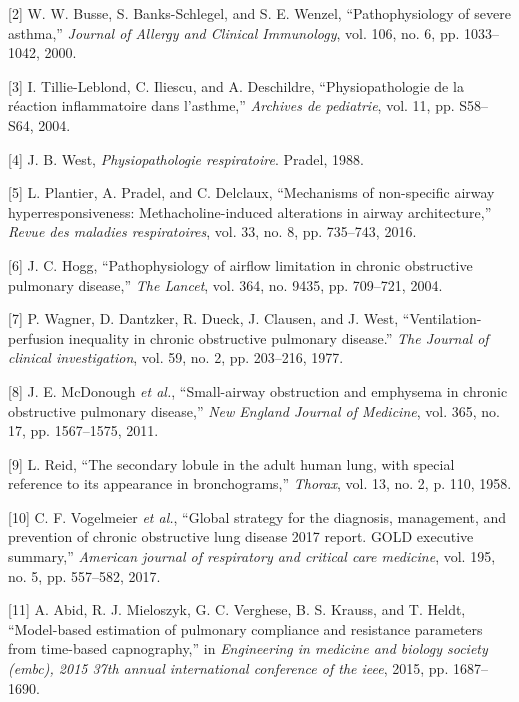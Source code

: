 \documentclass[12pt,]{article}
\begin{document}
\leavevmode\hypertarget{ref-busse2000pathophysiology}{}%
{[}2{]} W. W. Busse, S. Banks-Schlegel, and S. E. Wenzel,
``Pathophysiology of severe asthma,'' \emph{Journal of Allergy and
Clinical Immunology}, vol. 106, no. 6, pp. 1033--1042, 2000.

\leavevmode\hypertarget{ref-tillie2004physiopathologie}{}%
{[}3{]} I. Tillie-Leblond, C. Iliescu, and A. Deschildre,
``Physiopathologie de la réaction inflammatoire dans l'asthme,''
\emph{Archives de pediatrie}, vol. 11, pp. S58--S64, 2004.

\leavevmode\hypertarget{ref-west1988physiopathologie}{}%
{[}4{]} J. B. West, \emph{Physiopathologie respiratoire}. Pradel, 1988.

\leavevmode\hypertarget{ref-plantier2016mechanisms}{}%
{[}5{]} L. Plantier, A. Pradel, and C. Delclaux, ``Mechanisms of
non-specific airway hyperresponsiveness: Methacholine-induced
alterations in airway architecture,'' \emph{Revue des maladies
respiratoires}, vol. 33, no. 8, pp. 735--743, 2016.

\leavevmode\hypertarget{ref-hogg2004pathophysiology}{}%
{[}6{]} J. C. Hogg, ``Pathophysiology of airflow limitation in chronic
obstructive pulmonary disease,'' \emph{The Lancet}, vol. 364, no. 9435,
pp. 709--721, 2004.

\leavevmode\hypertarget{ref-wagner1977ventilation}{}%
{[}7{]} P. Wagner, D. Dantzker, R. Dueck, J. Clausen, and J. West,
``Ventilation-perfusion inequality in chronic obstructive pulmonary
disease.'' \emph{The Journal of clinical investigation}, vol. 59, no. 2,
pp. 203--216, 1977.

\leavevmode\hypertarget{ref-mcdonough2011small}{}%
{[}8{]} J. E. McDonough \emph{et al.}, ``Small-airway obstruction and
emphysema in chronic obstructive pulmonary disease,'' \emph{New England
Journal of Medicine}, vol. 365, no. 17, pp. 1567--1575, 2011.

\leavevmode\hypertarget{ref-reid1958secondary}{}%
{[}9{]} L. Reid, ``The secondary lobule in the adult human lung, with
special reference to its appearance in bronchograms,'' \emph{Thorax},
vol. 13, no. 2, p. 110, 1958.

\leavevmode\hypertarget{ref-vogelmeier2017global}{}%
{[}10{]} C. F. Vogelmeier \emph{et al.}, ``Global strategy for the
diagnosis, management, and prevention of chronic obstructive lung
disease 2017 report. GOLD executive summary,'' \emph{American journal of
respiratory and critical care medicine}, vol. 195, no. 5, pp. 557--582,
2017.

\leavevmode\hypertarget{ref-abid2015model}{}%
{[}11{]} A. Abid, R. J. Mieloszyk, G. C. Verghese, B. S. Krauss, and T.
Heldt, ``Model-based estimation of pulmonary compliance and resistance
parameters from time-based capnography,'' in \emph{Engineering in
medicine and biology society (embc), 2015 37th annual international
conference of the ieee}, 2015, pp. 1687--1690.
\end{document}

